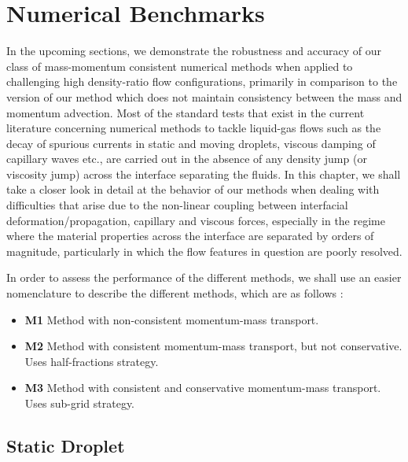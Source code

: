\setchapterpreamble[u]{\margintoc}
\chapter{Numerical Benchmarks}

In the upcoming sections, we demonstrate the robustness and accuracy of our class of mass-momentum consistent numerical methods when applied to challenging high density-ratio flow configurations, primarily in comparison to the version of our method which does not maintain consistency between the mass and momentum advection. Most of the standard tests that exist in the current literature concerning numerical methods to tackle liquid-gas flows such as the decay of spurious currents in static and moving droplets, viscous damping of capillary waves etc., are carried out in the absence of any density jump (or viscosity jump) across the interface separating the fluids. In this chapter, we shall take a closer look in detail at the behavior of our methods when dealing with difficulties that arise due to the non-linear coupling between interfacial deformation/propagation, capillary and viscous forces, especially in the regime where the material properties across the interface are separated by orders of magnitude, particularly in which the flow features in question are poorly resolved. 

In order to assess the performance of the different methods, we shall use an easier nomenclature to describe the different methods, which are as follows : 

\begin{itemize}
	\item \textbf{M1} Method with non-consistent momentum-mass transport.
	\item \textbf{M2} Method with consistent momentum-mass transport, but not conservative. Uses half-fractions strategy. 
	\item \textbf{M3} Method with consistent and conservative momentum-mass transport. Uses sub-grid strategy. 
\end{itemize}


\section{Static Droplet}

